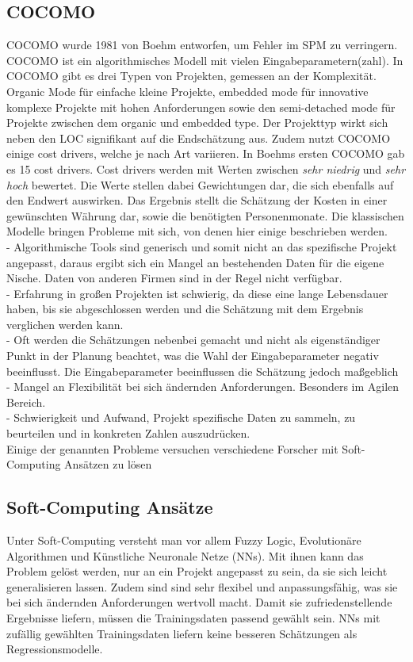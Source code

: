 \subsection{COCOMO}
 COCOMO wurde 1981 von Boehm entworfen, um Fehler im SPM zu verringern. COCOMO ist ein algorithmisches Modell mit vielen Eingabeparametern(zahl). In COCOMO gibt es drei Typen von Projekten, gemessen an der Komplexität. Organic Mode für einfache kleine Projekte, embedded mode für innovative komplexe Projekte mit hohen Anforderungen sowie den semi-detached mode für Projekte zwischen dem organic und embedded type. Der Projekttyp wirkt sich neben den LOC signifikant auf die Endschätzung aus. Zudem nutzt COCOMO einige cost drivers, welche je nach Art variieren. In Boehms ersten COCOMO gab es 15 cost drivers. Cost drivers werden mit Werten zwischen \textit{sehr niedrig} und \textit{sehr hoch} bewertet. Die Werte stellen dabei Gewichtungen dar, die sich ebenfalls auf den Endwert auswirken. Das Ergebnis stellt die Schätzung der Kosten in einer gewünschten Währung dar, sowie die benötigten Personenmonate. Die klassischen Modelle bringen Probleme mit sich, von denen hier einige beschrieben werden.
 \\
- Algorithmische Tools sind generisch und somit nicht an das spezifische Projekt angepasst, daraus ergibt sich ein Mangel an bestehenden Daten für die eigene Nische. Daten von anderen Firmen sind in der Regel nicht verfügbar. \\
- Erfahrung in großen Projekten ist schwierig, da diese eine lange Lebensdauer haben, bis sie abgeschlossen werden und die Schätzung mit dem Ergebnis verglichen werden kann.\\
- Oft werden die Schätzungen nebenbei gemacht und nicht als eigenständiger Punkt in der Planung beachtet, was die Wahl der Eingabeparameter negativ beeinflusst. Die Eingabeparameter beeinflussen die Schätzung jedoch maßgeblich\\
- Mangel an Flexibilität bei sich ändernden Anforderungen. Besonders im Agilen Bereich.\\
- Schwierigkeit und Aufwand, Projekt spezifische Daten zu sammeln, zu beurteilen und in konkreten Zahlen auszudrücken.
\cite{Chen2005}\cite{Heemstra1992}\cite{Abrahamsson2007}\\
Einige der genannten Probleme versuchen verschiedene Forscher mit Soft-Computing Ansätzen zu lösen\cite{Bilgaiyan2016}

\subsection{Soft-Computing Ansätze}
Unter Soft-Computing versteht man vor allem Fuzzy Logic, Evolutionäre Algorithmen und Künstliche Neuronale Netze (NNs). Mit ihnen kann das Problem gelöst werden, nur an ein Projekt angepasst zu sein, da sie sich leicht generalisieren lassen. Zudem sind sind sehr flexibel und anpassungsfähig, was sie bei sich ändernden Anforderungen wertvoll macht.\cite{Boetticher2001} Damit sie zufriedenstellende Ergebnisse liefern, müssen die Trainingsdaten passend gewählt sein. NNs mit zufällig gewählten Trainingsdaten liefern keine besseren Schätzungen als Regressionsmodelle. \cite{Setyawati2002}

